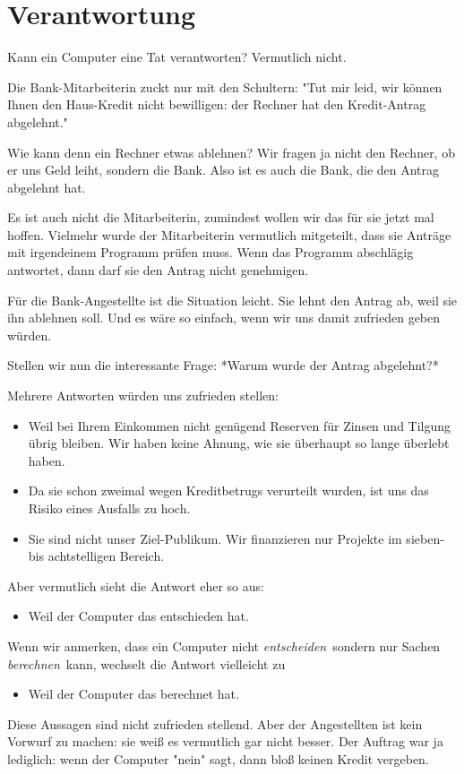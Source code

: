 \documentclass[a5paper,ngerman]{article}
\begin{document}
\section{Verantwortung}
\begin{multicols}{2}

Kann ein Computer eine Tat verantworten? Vermutlich nicht.

Die Bank-Mitarbeiterin zuckt nur mit den Schultern:
"Tut mir leid, wir können Ihnen den Haus-Kredit nicht bewilligen: der
Rechner hat den Kredit-Antrag abgelehnt."

Wie kann denn ein Rechner etwas ablehnen?
Wir fragen ja nicht den Rechner, ob er uns Geld leiht, sondern die
Bank.
Also ist es auch die Bank, die den Antrag abgelehnt hat.

Es ist auch nicht die Mitarbeiterin, zumindest wollen wir das für sie
jetzt mal hoffen.
Vielmehr wurde der Mitarbeiterin vermutlich mitgeteilt, dass sie
Anträge mit irgendeinem Programm prüfen muss.
Wenn das Programm abschlägig antwortet, dann darf sie den Antrag nicht
genehmigen.

Für die Bank-Angestellte ist die Situation leicht.
Sie lehnt den Antrag ab, weil sie ihn ablehnen soll.
Und es wäre so einfach, wenn wir uns damit zufrieden geben würden.

Stellen wir nun die interessante Frage:
*Warum wurde der Antrag abgelehnt?*

Mehrere Antworten würden uns zufrieden stellen:

\begin{itemize}
\item Weil bei Ihrem Einkommen nicht genügend Reserven für Zinsen und
  Tilgung übrig bleiben. Wir haben keine Ahnung, wie sie überhaupt so
  lange überlebt haben.
\item Da sie schon zweimal wegen Kreditbetrugs verurteilt wurden, ist uns
  das Risiko eines Ausfalls zu hoch.
\item Sie sind nicht unser Ziel-Publikum. Wir finanzieren nur Projekte im
  sieben- bis achtstelligen Bereich.
\end{itemize}

Aber vermutlich sieht die Antwort eher so aus:

\begin{itemize}
\item Weil der Computer das entschieden hat.
\end{itemize}

Wenn wir anmerken, dass ein Computer nicht \emph{entscheiden}\ sondern nur
Sachen \emph{berechnen}\ kann, wechselt die Antwort vielleicht zu

\begin{itemize}
\item Weil der Computer das berechnet hat.
\end{itemize}

Diese Aussagen sind nicht zufrieden stellend.
Aber der Angestellten ist kein Vorwurf zu machen: sie weiß es
vermutlich gar nicht besser.
Der Auftrag war ja lediglich: wenn der Computer "nein" sagt, dann
bloß keinen Kredit vergeben.


\end{multicols}
\end{document}
